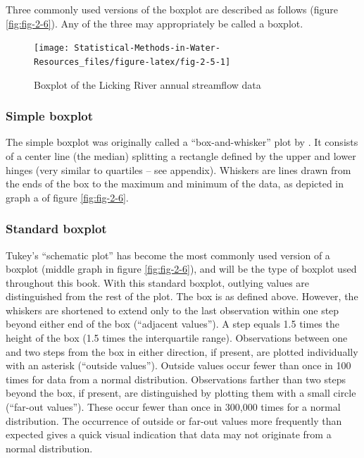 \documentclass[]{book}
\begin{document}
Three commonly used versions of the boxplot are described as follows (figure \ref{fig:fig-2-6}). Any of the three may appropriately be called a boxplot.

\begin{figure}

{\centering \texttt{[image: Statistical-Methods-in-Water-Resources\_files/figure-latex/fig-2-5-1]} 

}

\caption{Boxplot of the Licking River annual streamflow data}\label{fig:fig-2-5}
\end{figure}

\hypertarget{simple-boxplot}{%
\subsubsection{Simple boxplot}\label{simple-boxplot}}

The simple boxplot was originally called a ``box-and-whisker'' plot by \citet{tukey_exploratory_1977}. It consists of a center line (the median) splitting a rectangle defined by the upper and lower hinges (very similar to quartiles -- see appendix). Whiskers are lines drawn from the ends of the box to the maximum and minimum of the data, as depicted in graph a of figure \ref{fig:fig-2-6}.

\hypertarget{standard-boxplot}{%
\subsubsection{Standard boxplot}\label{standard-boxplot}}

Tukey's ``schematic plot'' has become the most commonly used version of a boxplot (middle graph in figure \ref{fig:fig-2-6}), and will be the type of boxplot used throughout this book. With this standard boxplot, outlying values are distinguished from the rest of the plot. The box is as defined above. However, the whiskers are shortened to extend only to the last observation within one step beyond either end of the box (``adjacent values''). A step equals 1.5 times the height of the box (1.5 times the interquartile range). Observations between one and two steps from the box in either direction, if present, are plotted individually with an asterisk (``outside values''). Outside values occur fewer than once in 100 times for data from a normal distribution. Observations farther than two steps beyond the box, if present, are distinguished by plotting them with a small circle (``far-out values''). These occur fewer than once in 300,000 times for a normal distribution. The occurrence of outside or far-out values more frequently than expected gives a quick visual indication that data may not originate from a normal distribution.
\end{document}
